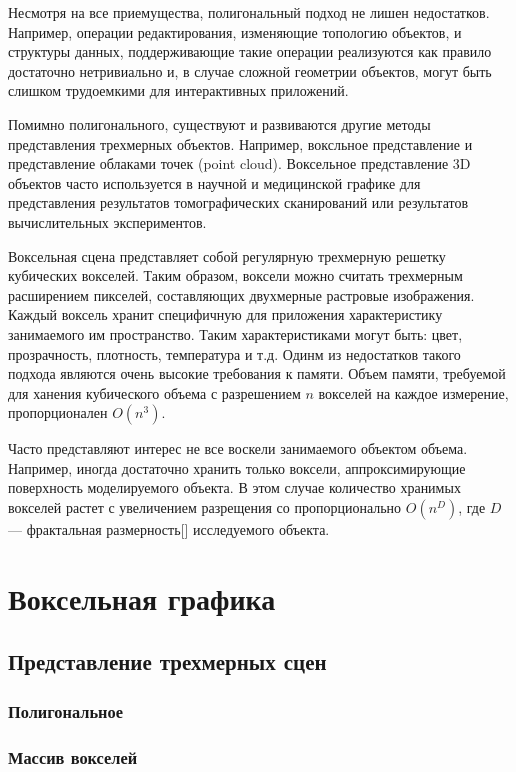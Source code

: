 \documentclass[a4paper,14pt]{extreport}
\begin{document}
Несмотря на все приемущества, полигональный подход не лишен недостатков. Например, операции редактирования, изменяющие топологию объектов, и структуры данных, поддерживающие такие операции реализуются как правило достаточно нетривиально и, в случае сложной геометрии объектов, могут быть слишком трудоемкими для интерактивных приложений.

Помимно полигонального, существуют и развиваются другие методы представления трехмерных объектов. Например, воксльное представление и представление облаками точек (point cloud). Воксельное представление 3D объектов часто используется в научной и медицинской графике для представления результатов томографических сканирований или результатов вычислительных экспериментов.

Воксельная сцена представляет собой регулярную трехмерную решетку кубических вокселей. Таким образом, воксели можно считать трехмерным расширением пикселей, составляющих двухмерные растровые изображения. Каждый воксель хранит специфичную для приложения характеристику занимаемого им пространство. Таким характеристиками могут быть: цвет, прозрачность, плотность, температура и т.д. Одинм из недостатков такого подхода являются очень высокие требования к памяти. Объем памяти, требуемой для ханения кубического объема с разрешением $n$ вокселей на каждое измерение, пропорционален $O(n^3)$.

Часто представляют интерес не все воскели занимаемого объектом объема. Например, иногда достаточно хранить только воксели, аппроксимирующие поверхность моделируемого объекта. В этом случае количество хранимых вокселей растет с увеличением разрещения со пропорционально $O(n^D)$, где $D$ --- фрактальная размерность[] исследуемого объекта.



\chapter{Воксельная графика}
\section{Представление трехмерных сцен}
\subsection{Полигональное}
\subsection{Массив вокселей}
\end{document}
